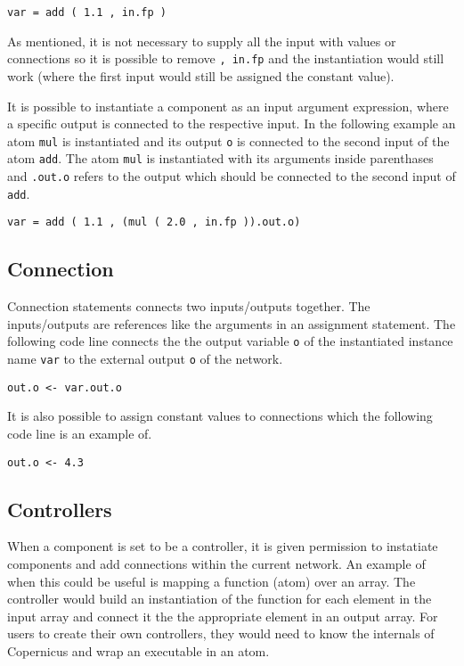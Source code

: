 \begin{verbatim}
var = add ( 1.1 , in.fp )
\end{verbatim}

As mentioned, it is not necessary to supply all the input with values
or connections so it is possible to remove \verb#, in.fp# and the
instantiation would still work (where the first input would still be
assigned the constant value).

It is possible to instantiate a component as an input argument
expression, where a specific output is connected to the respective
input. In the following example an atom \verb#mul# is instantiated and
its output \verb#o# is connected to the second input of the atom
\verb#add#. The atom \verb#mul# is instantiated with its arguments
inside parenthases and \verb#.out.o# refers to the output which should
be connected to the second input of \verb#add#.

\begin{verbatim}
var = add ( 1.1 , (mul ( 2.0 , in.fp )).out.o)
\end{verbatim}

\subsection{Connection}
Connection statements connects two inputs/outputs together. The
inputs/outputs are references like the arguments in an assignment
statement. The following code line connects the the output variable
\verb#o# of the instantiated instance name \verb#var# to the external
output \verb#o# of the network.

\begin{verbatim}
out.o <- var.out.o
\end{verbatim}

It is also possible to assign constant values to connections which the
following code line is an example of.

\begin{verbatim}
out.o <- 4.3
\end{verbatim}

\subsection{Controllers} \label{sec:control}
When a component is set to be a controller, it is given permission to
instatiate components and add connections within the current
network. An example of when this could be useful is mapping a function
(atom) over an array. The controller would build an instantiation of
the function for each element in the input array and connect it the
the appropriate element in an output array. For users to create their
own controllers, they would need to know the internals of Copernicus
and wrap an executable in an atom.

